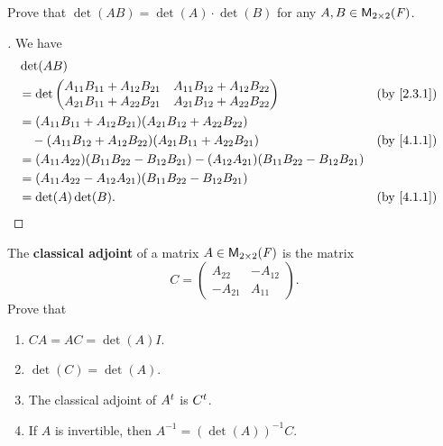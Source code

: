 \begin{ex}\label{ex:4.1.9}
  Prove that \(\det(AB) = \det(A) \cdot \det(B)\) for any \(A, B \in \ms[2][2][\F]\).
\end{ex}

\begin{proof}[]
  We have
  \begin{align*}
     & \det(AB)                                                                                                                        \\
     & = \det\begin{pmatrix}
               A_{1 1} B_{1 1} + A_{1 2} B_{2 1} & A_{1 1} B_{1 2} + A_{1 2} B_{2 2} \\
               A_{2 1} B_{1 1} + A_{2 2} B_{2 1} & A_{2 1} B_{1 2} + A_{2 2} B_{2 2}
             \end{pmatrix}                                        &  & \by{2.3.1}                                                     \\
     & = (A_{1 1} B_{1 1} + A_{1 2} B_{2 1}) (A_{2 1} B_{1 2} + A_{2 2} B_{2 2})                                                       \\
     & \quad - (A_{1 1} B_{1 2} + A_{1 2} B_{2 2}) (A_{2 1} B_{1 1} + A_{2 2} B_{2 1})                                 &  & \by{4.1.1} \\
     & = (A_{1 1} A_{2 2}) (B_{1 1} B_{2 2} - B_{1 2} B_{2 1}) - (A_{1 2} A_{2 1}) (B_{1 1} B_{2 2} - B_{1 2} B_{2 1})                 \\
     & = (A_{1 1} A_{2 2} - A_{1 2} A_{2 1}) (B_{1 1} B_{2 2} - B_{1 2} B_{2 1})                                                       \\
     & = \det(A) \det(B).                                                                                              &  & \by{4.1.1}
  \end{align*}
\end{proof}

\begin{ex}\label{ex:4.1.10}
  The \textbf{classical adjoint} of a matrix \(A \in \ms[2][2][\F]\) is the matrix
  \[
    C = \begin{pmatrix}
      A_{2 2}  & -A_{1 2} \\
      -A_{2 1} & A_{1 1}
    \end{pmatrix}.
  \]
  Prove that
  \begin{enumerate}
    \item \(CA = AC = \det(A) I\).
    \item \(\det(C) = \det(A)\).
    \item The classical adjoint of \({A}^{t}\) is \({C}^{t}\).
    \item If \(A\) is invertible, then \(A^{-1} = (\det(A))^{-1} C\).
  \end{enumerate}
\end{ex}

